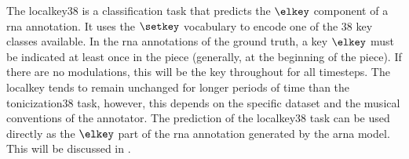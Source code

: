 
The \gls{localkey38} is a classification task that predicts
the $\elkey$ component of a \gls{rna} annotation. It uses
the $\setkey$ vocabulary to encode one of the 38 key classes
available. In the \gls{rna} annotations of the ground truth,
a key $\elkey$ must be indicated at least once in the piece
(generally, at the beginning of the piece). If there are no
modulations, this will be the key throughout for all
timesteps. The \gls{localkey} tends to remain unchanged for
longer periods of time than the \gls{tonicization38} task,
however, this depends on the specific dataset and the
musical conventions of the annotator. The prediction of the
\gls{localkey38} task can be used directly as the $\elkey$
part of the \gls{rna} annotation generated by the \gls{arna}
model. This will be discussed in .


